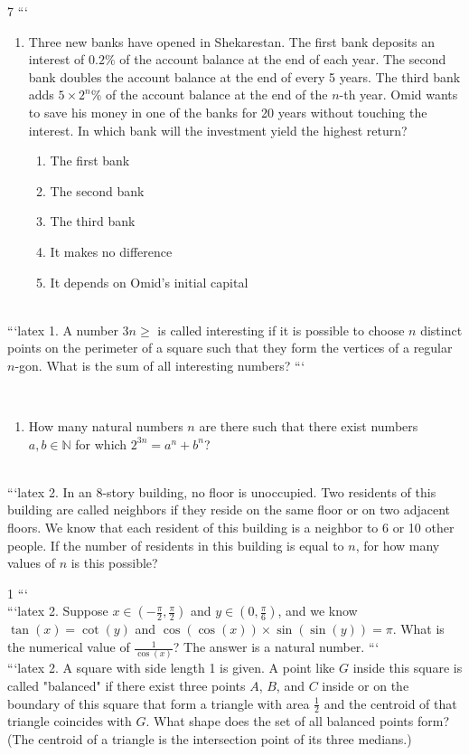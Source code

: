 7
```
\\
\begin{enumerate}
    \item Three new banks have opened in Shekarestan. The first bank deposits an interest of $0.2\%$ of the account balance at the end of each year. The second bank doubles the account balance at the end of every 5 years. The third bank adds $5 \times 2^n\%$ of the account balance at the end of the $n$-th year. Omid wants to save his money in one of the banks for 20 years without touching the interest. In which bank will the investment yield the highest return?
    \begin{enumerate}
        \item The first bank
        \item The second bank
        \item The third bank
        \item It makes no difference
        \item It depends on Omid's initial capital
    \end{enumerate}
\end{enumerate}
\\
```latex
1. A number $3n \geq$ is called interesting if it is possible to choose $n$ distinct points on the perimeter of a square such that they form the vertices of a regular $n$-gon. What is the sum of all interesting numbers?
```

\\
\begin{enumerate}
    \item How many natural numbers $n$ are there such that there exist numbers $a, b \in \mathbb{N}$ for which $2^{3n} = a^n + b^n$?
\end{enumerate}
\\
```latex
2. In an 8-story building, no floor is unoccupied. Two residents of this building are called neighbors if they reside on the same floor or on two adjacent floors. We know that each resident of this building is a neighbor to 6 or 10 other people. If the number of residents in this building is equal to $n$, for how many values of $n$ is this possible?

1
```
\\
```latex
2. Suppose $x \in \left(-\frac{\pi}{2}, \frac{\pi}{2}\right)$ and $y \in \left(0, \frac{\pi}{6}\right)$, and we know $\tan(x) = \cot(y)$ and $\cos(\cos(x)) \times \sin(\sin(y)) = \pi$. What is the numerical value of $\frac{1}{\cos(x)}$? The answer is a natural number.
```
\\
```latex
2. A square with side length 1 is given. A point like \( G \) inside this square is called "balanced" if there exist three points \( A \), \( B \), and \( C \) inside or on the boundary of this square that form a triangle with area \(\frac{1}{2}\) and the centroid of that triangle coincides with \( G \). What shape does the set of all balanced points form? 
(The centroid of a triangle is the intersection point of its three medians.)

